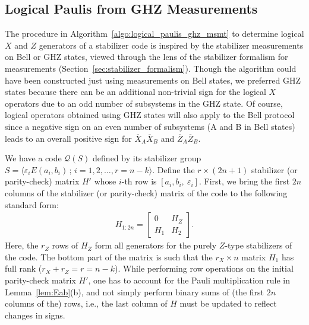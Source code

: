 \documentclass[journal,onecolumn]{IEEEtran}
\begin{document}
\subsection{Logical Paulis from GHZ Measurements}
\label{sec:logical_paulis_ghz_msmt}


The procedure in Algorithm~\ref{algo:logical_paulis_ghz_msmt} to determine logical $X$ and $Z$ generators of a stabilizer code is inspired by the stabilizer measurements on Bell or GHZ states, viewed through the lens of the stabilizer formalism for measurements (Section~\ref{sec:stabilizer_formalism}).
Though the algorithm could have been constructed just using measurements on Bell states, we preferred GHZ states because there can be an additional non-trivial sign for the logical $X$ operators due to an odd number of subsystems in the GHZ state.
Of course, logical operators obtained using GHZ states will also apply to the Bell protocol since a negative sign on an even number of subsystems (A and B in Bell states) leads to an overall positive sign for $\overline{X}_A \overline{X}_B$ and $\overline{Z}_A \overline{Z}_B$.

We have a code $\mathcal{Q}(S)$ defined by its stabilizer group $S = \langle \varepsilon_i E(a_i,b_i) \, ; \, i = 1,2,\ldots,r=n-k \rangle$.
Define the $r \times (2n+1)$ stabilizer (or parity-check) matrix $H'$ whose $i$-th row is $[a_i,b_i,\ \varepsilon_i]$.
First, we bring the first $2n$ columns of the stabilizer (or parity-check) matrix of the code to the following standard form:
\begin{align}
H_{1:2n} = 
\begin{bmatrix}
0 & H_Z \\
H_1 & H_2
\end{bmatrix}.
\end{align}
Here, the $r_Z$ rows of $H_Z$ form all generators for the purely $Z$-type stabilizers of the code.
The bottom part of the matrix is such that the $r_X \times n$ matrix $H_1$ has full rank ($r_X + r_Z = r = n-k$).
While performing row operations on the initial parity-check matrix $H'$, one has to account for the Pauli multiplication rule in Lemma~\ref{lem:Eab}(b), and not simply perform binary sums of (the first $2n$ columns of the) rows, i.e., the last column of $H$ must be updated to reflect changes in signs.
\end{document}
